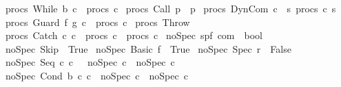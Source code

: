 \begin{isabellebody}
{\isachardoublequoteopen}procs\ {\isacharparenleft}While\ b\ c{\isacharparenright}\ {\isacharequal}\ procs\ c{\isachardoublequoteclose}\ {\isacharbar}\isanewline
{\isachardoublequoteopen}procs\ {\isacharparenleft}Call\ p{\isacharparenright}\ {\isacharequal}\ {\isacharbraceleft}p{\isacharbraceright}{\isachardoublequoteclose}\ {\isacharbar}\isanewline
{\isachardoublequoteopen}procs\ {\isacharparenleft}DynCom\ c{\isacharparenright}\ {\isacharequal}\ {\isacharparenleft}{\isasymUnion}s{\isachardot}\ procs\ {\isacharparenleft}c\ s{\isacharparenright}{\isacharparenright}{\isachardoublequoteclose}\ {\isacharbar}\isanewline
{\isachardoublequoteopen}procs\ {\isacharparenleft}Guard\ f\ g\ c{\isacharparenright}\ {\isacharequal}\ procs\ c{\isachardoublequoteclose}\ {\isacharbar}\isanewline
{\isachardoublequoteopen}procs\ Throw\ {\isacharequal}\ {\isacharbraceleft}{\isacharbraceright}{\isachardoublequoteclose}\ {\isacharbar}\isanewline
{\isachardoublequoteopen}procs\ {\isacharparenleft}Catch\ c\ c\ {\isacharequal}\ {\isacharparenleft}procs\ c\ {\isasymunion}\ procs\ c\isanewline
\isanewline
{}\isamarkupfalse%
\ noSpec{\isacharcolon}{\isacharcolon}\ {\isachardoublequoteopen}{\isacharparenleft}{\isacharprime}s{\isacharcomma}{\isacharprime}p{\isacharcomma}{\isacharprime}f{\isacharparenright}\ com\ {\isasymRightarrow}\ bool{\isachardoublequoteclose}\isanewline
{}\isanewline
{\isachardoublequoteopen}noSpec\ Skip\ {\isacharequal}\ True{\isachardoublequoteclose}\ {\isacharbar}\isanewline
{\isachardoublequoteopen}noSpec\ {\isacharparenleft}Basic\ f{\isacharparenright}\ {\isacharequal}\ True{\isachardoublequoteclose}\ {\isacharbar}\isanewline
{\isachardoublequoteopen}noSpec\ {\isacharparenleft}Spec\ r{\isacharparenright}\ {\isacharequal}\ False{\isachardoublequoteclose}\ {\isacharbar}\isanewline
{\isachardoublequoteopen}noSpec\ {\isacharparenleft}Seq\ c\ c\ \ {\isacharequal}\ {\isacharparenleft}noSpec\ c\ {\isasymand}\ noSpec\ c\ {\isacharbar}\isanewline
{\isachardoublequoteopen}noSpec\ {\isacharparenleft}Cond\ b\ c\ c\ {\isacharequal}\ {\isacharparenleft}noSpec\ c\ {\isasymand}\ noSpec\ c\ {\isacharbar}\isanewline

\end{isabellebody}
